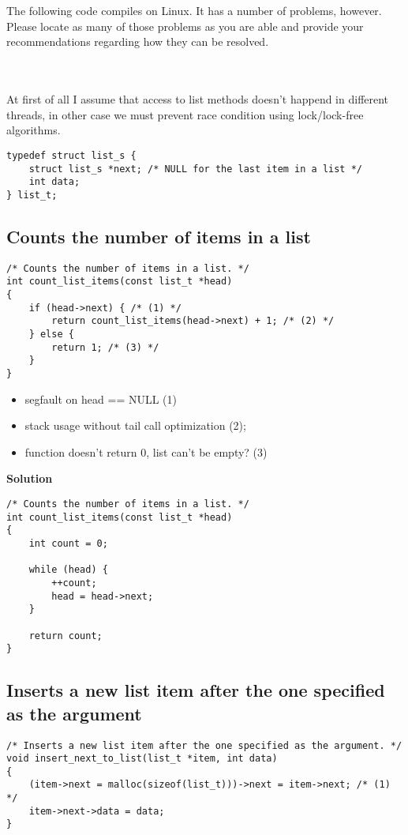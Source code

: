\documentclass[a4paper,12pt]{article}
\begin{document}
\section{}
The following code compiles on Linux. It has a number of problems, however. Please locate as many of those problems as you are able and provide your recommendations regarding how they can be resolved.

\noindent\makebox[\linewidth]{\rule{\textwidth}{0.4pt}}
\\
\\
At first of all I assume that access to list methods doesn't happend in different threads, in other case we must prevent race condition using lock/lock-free algorithms.

\begin{lstlisting}
typedef struct list_s {
	struct list_s *next; /* NULL for the last item in a list */
	int data;
} list_t;
\end{lstlisting}

\subsection{Counts the number of items in a list}
\begin{lstlisting}
/* Counts the number of items in a list. */
int count_list_items(const list_t *head)
{
	if (head->next) { /* (1) */
		return count_list_items(head->next) + 1; /* (2) */
	} else {
		return 1; /* (3) */
	}
}
\end{lstlisting}

\begin{itemize}
	\item[\textcolor{black}\textbullet] segfault on head == NULL (1)
	\item[\textcolor{black}\textbullet] stack usage without tail call optimization (2);
	\item[\textcolor{black}\textbullet] function doesn't return 0, list can't be empty? (3)
\end{itemize}

\textbf{Solution}
\begin{lstlisting}
/* Counts the number of items in a list. */
int count_list_items(const list_t *head)
{
	int count = 0;
	
	while (head) {
		++count;
		head = head->next;
	}
	
	return count;
}
\end{lstlisting}

\pagebreak

\subsection{Inserts a new list item after the one specified as the argument}
\begin{lstlisting}
/* Inserts a new list item after the one specified as the argument. */
void insert_next_to_list(list_t *item, int data)
{
	(item->next = malloc(sizeof(list_t)))->next = item->next; /* (1) */
	item->next->data = data;
}
\end{lstlisting}
\end{document}
